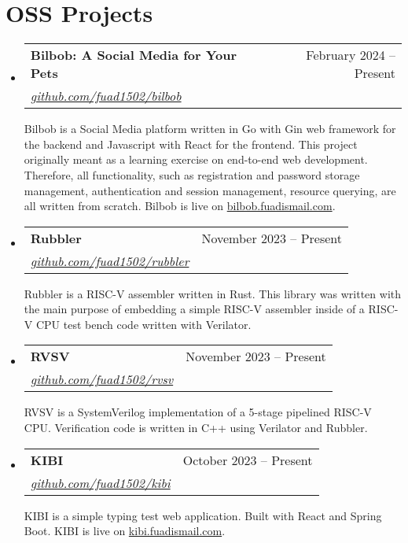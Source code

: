 \documentclass[letterpaper,11pt]{article}
\makeatletter
\newcommand{\resumeProjectHeading}[3]{
  \item
  \begin{tabular*}{0.97\textwidth}{l@{\extracolsep{\fill}}r}
    \small\textbf{#1} & #2 \\
    \textit{\small#3} \\
  \end{tabular*}\vspace{-7pt}
}
\newcommand{\resumeSubHeadingListStart}{\begin{itemize}[leftmargin=0.15in, label={}]}
\newcommand{\resumeSubHeadingListEnd}{\end{itemize}}
\makeatother
\begin{document}
\section{OSS Projects}
\resumeSubHeadingListStart
\resumeProjectHeading
  {Bilbob: A Social Media for Your Pets}{February 2024 -- Present}
  {\href{https://github.com/fuad1502/bilbob}{github.com/fuad1502/bilbob}}
\begin{justify}
Bilbob is a Social Media platform written in Go with Gin web framework for the
  backend and Javascript with React for the frontend. This project originally
  meant as a learning exercise on end-to-end web development. Therefore, all
  functionality, such as registration and password storage management,
  authentication and session management, resource querying, are all written
  from scratch. Bilbob is live on
  \href{http://bilbob.fuadismail.com}{bilbob.fuadismail.com}.
\end{justify}

\resumeProjectHeading
  {Rubbler}{November 2023 -- Present}
  {\href{https://github.com/fuad1502/rubbler}{github.com/fuad1502/rubbler}}
\begin{justify}
  Rubbler is a RISC-V assembler written in Rust. This library was written with
  the main purpose of embedding a simple RISC-V assembler inside of a RISC-V
  CPU test bench code written with Verilator.
\end{justify}

\resumeProjectHeading
  {RVSV}{November 2023 -- Present}
  {\href{https://github.com/fuad1502/rvsv}{github.com/fuad1502/rvsv}}
\begin{justify}
  RVSV is a SystemVerilog implementation of a 5-stage pipelined RISC-V CPU.
  Verification code is written in C++ using Verilator and Rubbler.
\end{justify}

\resumeProjectHeading
  {KIBI}{October 2023 -- Present}
  {\href{https://github.com/fuad1502/kibi}{github.com/fuad1502/kibi}}
\begin{justify}
  KIBI is a simple typing test web application. Built with React and Spring
  Boot. KIBI is live on \href{http://kibi.fuadismail.com}{kibi.fuadismail.com}.
\end{justify}
\resumeSubHeadingListEnd

\end{document}
